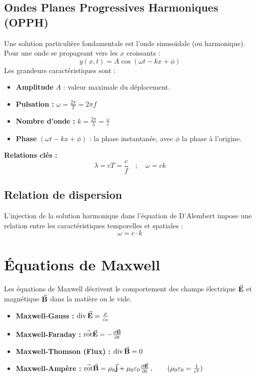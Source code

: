\documentclass[a4paper,12pt]{article}
\newcommand{\rot}{\va{\operatorname{rot}}}
\renewcommand{\div}{\operatorname{div}}
\begin{document}
        \subsection{Ondes Planes Progressives Harmoniques (OPPH)}
            Une solution particulière fondamentale est l'onde sinusoïdale (ou harmonique). Pour une onde se propageant vers les $x$ croissants :
            $$ \boxed{y(x,t) = A \cos(\omega t - kx + \phi)} $$
            Les grandeurs caractéristiques sont :
            \begin{itemize}
                \item \textbf{Amplitude} $A$ : valeur maximale du déplacement.
                \item \textbf{Pulsation :} $\omega = \frac{2\pi}{T} = 2\pi f$
                \item \textbf{Nombre d'onde :} $k = \frac{2\pi}{\lambda} = \frac{\omega}{c}$
                \item \textbf{Phase} $(\omega t - kx + \phi)$ : la phase instantanée, avec $\phi$ la phase à l'origine.
            \end{itemize}
            \textbf{Relations clés :}
            $$ \boxed{\lambda = cT = \frac{c}{f}} \quad ; \quad \boxed{\omega = ck} $$

        \subsection{Relation de dispersion}
            L'injection de la solution harmonique dans l'équation de D'Alembert impose une relation entre les caractéristiques temporelles et spatiales :
            $$ \boxed{\omega = c \cdot k} $$
           
    \section{Équations de Maxwell}
        Les équations de Maxwell décrivent le comportement des champs électrique $\va{E}$ et magnétique $\va{B}$ dans la matière ou le vide.

        \begin{itemize}
            \item \textbf{Maxwell-Gauss :} $\div \va{E} = \frac{\rho}{\varepsilon_0}$
            \item \textbf{Maxwell-Faraday :} $\rot \va{E} = -\pdv{\va{B}}{t}$
            \item \textbf{Maxwell-Thomson (Flux) :} $\div \va{B} = 0$
            \item \textbf{Maxwell-Ampère :} $\rot \va{B} = \mu_0 \va{j} + \mu_0 \varepsilon_0 \pdv{\va{E}}{t}\, , \qquad (\mu_0\varepsilon_0 = \frac{1}{c^2})$
        \end{itemize}
\end{document}
